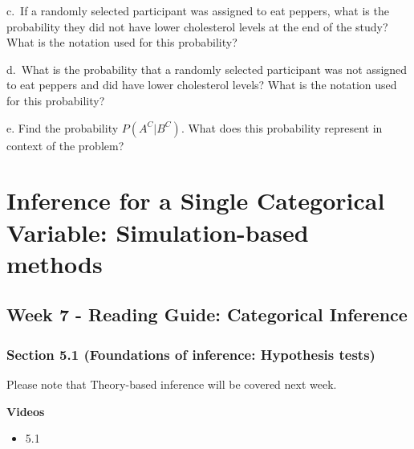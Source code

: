 \documentclass[
]{report}
\providecommand{\tightlist}{%
  \setlength{\itemsep}{0pt}\setlength{\parskip}{0pt}}
\newcommand{\rgi}{\hspace{24pt}}  %
\begin{document}
\vspace{0.1in}

\rgi c.~If a randomly selected participant was assigned to eat peppers, what is the probability they did not have lower cholesterol levels at the end of the study? What is the notation used for this probability?
\vspace{0.5in}

\rgi d.~What is the probability that a randomly selected participant was not assigned to eat peppers and did have lower cholesterol levels? What is the notation used for this probability?
\vspace{0.5in}

\rgi e. Find the probability \(P(A^C | B^C)\). What does this probability represent in context of the problem?
\vspace{0.5in}

\newpage

\hypertarget{inference-for-a-single-categorical-variable-simulation-based-methods}{%
\chapter{Inference for a Single Categorical Variable: Simulation-based methods}\label{inference-for-a-single-categorical-variable-simulation-based-methods}}

\hypertarget{week-7---reading-guide-categorical-inference}{%
\section{Week 7 - Reading Guide: Categorical Inference}\label{week-7---reading-guide-categorical-inference}}

\hypertarget{section-5.1-foundations-of-inference-hypothesis-tests}{%
\subsection*{Section 5.1 (Foundations of inference: Hypothesis tests)}\label{section-5.1-foundations-of-inference-hypothesis-tests}}

Please note that Theory-based inference will be covered next week.

\textbf{Videos}

\begin{itemize}
\tightlist
\item
  5.1
\end{itemize}
\end{document}
